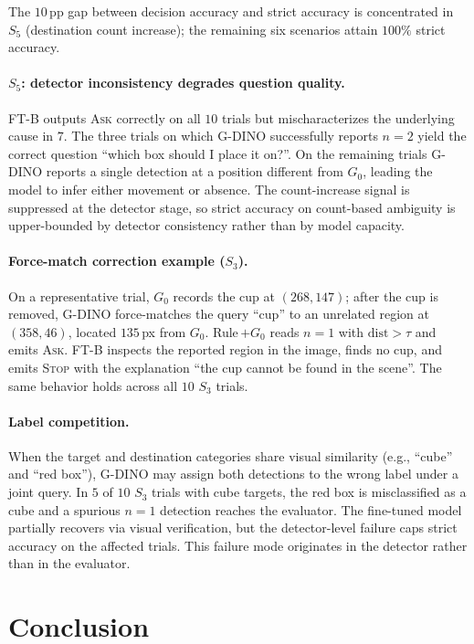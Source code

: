 \documentclass{article}
\begin{document}
The $10$\,pp gap between decision accuracy and strict accuracy is
concentrated in $S_5$ (destination count increase); the remaining six
scenarios attain $100\%$ strict accuracy.

\paragraph{$S_5$: detector inconsistency degrades question quality.}
FT-B outputs \textsc{Ask} correctly on all $10$ trials but
mischaracterizes the underlying cause in $7$. The three trials on which
G-DINO successfully reports $n=2$ yield the correct question ``which
box should I place it on?''. On the remaining trials G-DINO reports a
single detection at a position different from $G_0$, leading the model
to infer either movement or absence. The count-increase signal is
suppressed at the detector stage, so strict accuracy on count-based
ambiguity is upper-bounded by detector consistency rather than by model
capacity.

\paragraph{Force-match correction example ($S_3$).}
On a representative trial, $G_0$ records the cup at $(268,147)$; after
the cup is removed, G-DINO force-matches the query ``cup'' to an
unrelated region at $(358,46)$, located $135$\,px from $G_0$.
Rule\,$+G_0$ reads $n=1$ with $\text{dist}>\tau$ and emits \textsc{Ask}.
FT-B inspects the reported region in the image, finds no cup, and
emits \textsc{Stop} with the explanation ``the cup cannot be found in
the scene''. The same behavior holds across all $10$ $S_3$ trials.

\paragraph{Label competition.}
When the target and destination categories share visual similarity
(e.g., ``cube'' and ``red box''), G-DINO may assign both detections to
the wrong label under a joint query. In $5$ of $10$ $S_3$ trials with
cube targets, the red box is misclassified as a cube and a spurious
$n=1$ detection reaches the evaluator. The fine-tuned model partially
recovers via visual verification, but the detector-level failure caps
strict accuracy on the affected trials. This failure mode originates
in the detector rather than in the evaluator.

\section{Conclusion}
\label{sec:conclusion}
\end{document}

